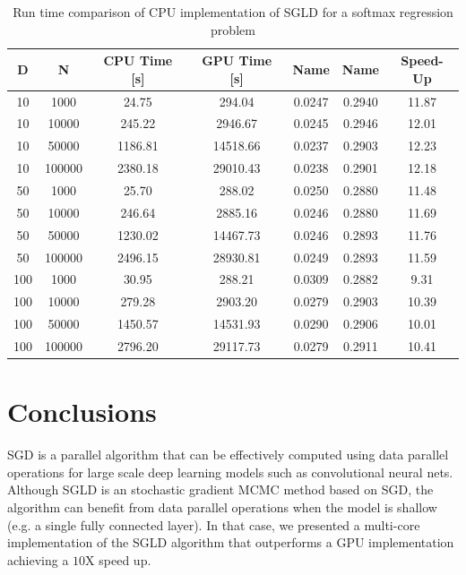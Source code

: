 \documentclass[9pt,lineno]{crone}
\begin{document}
\begin{table}[h]
	\centering
	\begin{tabular}{|c|c|c|c|c|c|c|}
		\hline 
		D & N & CPU Time [s] & GPU Time [s] & Name & Name & Speed-Up\\ 
		\hline 		
10	& 1000& 	24.75& 294.04  & 0.0247& 0.2940& 11.87\\
10	& 10000& 	245.22& 2946.67	& 0.0245& 0.2946& 12.01\\
10	& 50000& 	1186.81& 14518.66 & 0.0237& 0.2903& 12.23\\
10	& 100000	& 2380.18& 29010.43	& 0.0238& 0.2901& 12.18\\
\hline
50	& 1000	& 25.70& 288.02	& 0.0250& 0.2880& 11.48\\
50	& 10000	& 246.64& 2885.16	& 0.0246& 0.2880& 11.69\\
50	& 50000	& 1230.02& 14467.73	& 0.0246& 0.2893& 11.76\\
50 & 	100000	& 2496.15& 28930.81	& 0.0249& 0.2893& 11.59\\
\hline
100	& 1000	& 30.95& 288.21	& 0.0309& 0.2882& 9.31\\
100	& 10000	& 279.28& 2903.20& 0.0279& 0.2903& 10.39\\
100	& 50000	& 1450.57& 14531.93& 0.0290& 0.2906& 10.01\\
100	& 100000& 	2796.20& 29117.73& 0.0279& 0.2911& 10.41\\

		\hline 
\end{tabular}
\caption{Run time comparison of CPU implementation of SGLD for a softmax regression problem}
\label{tab:sgld} 
\end{table}

\section{Conclusions}
SGD is a parallel algorithm that can be effectively computed using data parallel operations for large scale deep learning models such as convolutional neural nets. Although SGLD is an stochastic gradient MCMC method based on SGD, the algorithm can benefit from data parallel operations when the model is shallow (e.g. a single fully connected layer). In that case, we presented a multi-core implementation of the SGLD algorithm that outperforms a GPU implementation achieving a $10$X speed up. 


\end{document}
